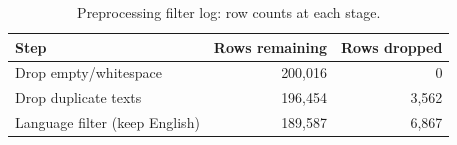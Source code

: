 \begin{table}[h]
\centering
\caption{Preprocessing filter log: row counts at each stage.}
\label{tab:preprocessing_log}
\begin{tabular}{lrr}
\toprule
Step & Rows remaining & Rows dropped \\
\midrule
Drop empty/whitespace & 200,016 & 0 \\
Drop duplicate texts & 196,454 & 3,562 \\
Language filter (keep English) & 189,587 & 6,867 \\
\bottomrule
\end{tabular}
\end{table}